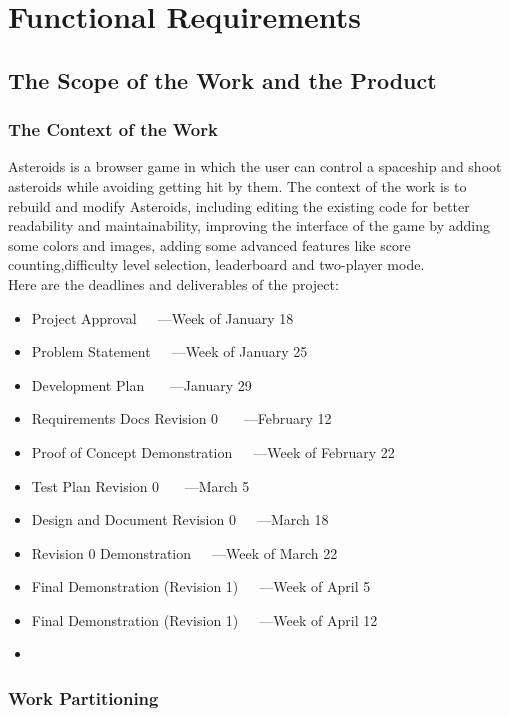 \documentclass[12pt, titlepage]{article}
\begin{document}
\section{Functional Requirements}

\subsection{The Scope of the Work and the Product}

\subsubsection{The Context of the Work}
Asteroids is a browser game in which the user can control a spaceship and shoot asteroids while avoiding getting hit by them. The context of the work is to rebuild and modify Asteroids, including editing the existing code for better readability and maintainability, improving the interface of the game by adding some colors and images, adding some advanced features like score counting,difficulty level selection, leaderboard and two-player mode.\\
Here are the deadlines and deliverables of the project:
\begin{itemize}
\item Project Approval~~~---Week of January 18
\item Problem Statement~~~---Week of January 25
\item Development Plan~~~ ---January 29
\item Requirements Docs Revision 0~~~ ---February 12
\item Proof of Concept Demonstration~~~---Week of February 22
\item Test Plan Revision 0~~~ ---March 5
\item Design and Document Revision 0~~~---March 18
\item Revision 0 Demonstration~~~---Week of March 22
\item Final Demonstration (Revision 1)~~~---Week of April 5
\item Final Demonstration (Revision 1)~~~---Week of April 12

\item 

\end{itemize}

\subsubsection{Work Partitioning}
\end{document}
